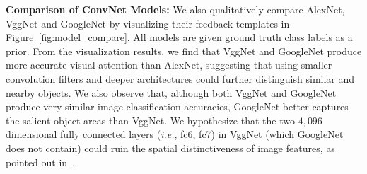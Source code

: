 \textbf{Comparison of ConvNet Models:} We also qualitatively compare AlexNet, VggNet and GoogleNet by visualizing their feedback templates in Figure~\ref{fig:model_compare}. All models are given ground truth class labels as a prior. From the visualization results, we find that VggNet and GoogleNet produce more accurate visual attention than AlexNet, suggesting that using smaller convolution filters and deeper architectures could further distinguish similar and nearby objects. We also observe that, although both VggNet and GoogleNet produce very similar image classification accuracies, GoogleNet better captures the salient object areas than VggNet. We hypothesize that the two $4,096$ dimensional fully connected layers (\emph{i.e.}, fc6, fc7) in VggNet (which GoogleNet does not contain) could ruin the spatial distinctiveness of image features, as pointed out in~\cite{lin2013network}.

